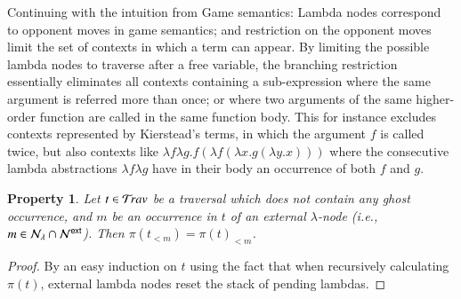 \documentclass{elsarticle}
\makeatletter
\theoremstyle{plain}
\newtheorem{property}[theorem]{Property}
\theoremstyle{definition}
\theoremstyle{remark}
\newcommand\Nodes{\mathcal{N}}%
\newcommand\NodesLmd{\Nodes_\lambda}%
\newcommand{\travulc}{\travset}
\def\coresymbol{\pi} %
\newcommand{\core}[1]{\coresymbol(#1)} %
\newcommand{\ExtNodes}{\Nodes^{\sf ext}}
\renewcommand\ie{{\it i.e.\@\xspace}}
\makeatother
\begin{document}
Continuing with the intuition from Game semantics: Lambda nodes correspond to opponent moves in game semantics; and restriction on the opponent moves limit the set of contexts in which a term can appear. By limiting the possible lambda nodes to traverse after a free variable, the branching restriction essentially eliminates all contexts containing a sub-expression where the same argument is referred more than once; or where two arguments of the same higher-order function are called in the same function body. This for instance excludes contexts represented by Kierstead's terms, in which the argument $f$ is called twice, but also contexts like  $\lambda f \lambda g . f (\lambda f (\lambda x . g (\lambda y . x)))$ where the consecutive lambda abstractions $\lambda f \lambda g$ have in their body an occurrence of both $f$ and $g$.

\begin{property}
\label{prop:core_truncation_at_externallambda}
Let $t\in\travulc$ be a traversal which does not contain any ghost occurrence, and $m$ be an occurrence in $t$ of an external $\lambda$-node (\ie, $m \in \NodesLmd\inter\ExtNodes$). Then $\core{t_{<m}} = \core{t}_{<m}$.
\end{property}
\begin{proof}
By an easy induction on $t$ using the fact that when recursively calculating $\coresymbol(t)$, external lambda nodes reset the stack of pending lambdas.
\end{proof}
\end{document}
